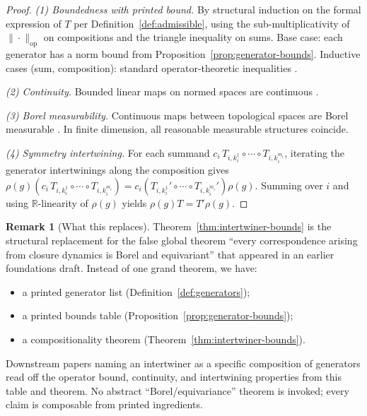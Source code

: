 \documentclass[11pt, a4paper]{amsart}
\theoremstyle{definition}
\newtheorem{remark}[theorem]{Remark}
\newcommand{\R}{\mathbb{R}}
\newcommand{\op}{\operatorname{op}}
\begin{document}
\begin{proof}
\emph{(1) Boundedness with printed bound.} By structural induction
on the formal expression of $T$ per
Definition~\ref{def:admissible}, using the sub-multiplicativity
of $\|\cdot\|_{\op}$ on compositions and the triangle inequality on
sums. Base case: each generator has a norm bound from
Proposition~\ref{prop:generator-bounds}. Inductive cases (sum,
composition): standard operator-theoretic inequalities
\cite[Ch.~I.1]{ReedSimonI}.

\emph{(2) Continuity.} Bounded linear maps on normed spaces are
continuous \cite[Thm.~I.1.3]{ReedSimonI}.

\emph{(3) Borel measurability.} Continuous maps between
topological spaces are Borel measurable
\cite[Cor.~1.2.12]{Bogachev}. In finite dimension, all reasonable
measurable structures coincide.

\emph{(4) Symmetry intertwining.} For each summand
$c_i \, T_{i, k_i^1} \circ \cdots \circ T_{i, k_i^{m_i}}$,
iterating the generator intertwinings along the composition
gives
$\rho(g) (c_i \, T_{i, k_i^1} \circ \cdots \circ T_{i, k_i^{m_i}})
= c_i (T_{i, k_i^1}' \circ \cdots \circ T_{i, k_i^{m_i}}')
\rho(g)$.
Summing over $i$ and using $\R$-linearity of $\rho(g)$ yields
$\rho(g) T = T' \rho(g)$.
\end{proof}

\begin{remark}[What this replaces]
\label{rmk:intertwiner-replacement}
Theorem~\ref{thm:intertwiner-bounds} is the structural replacement
for the false global theorem ``every correspondence arising from
closure dynamics is Borel and equivariant'' that appeared in an
earlier foundations draft. Instead of one grand theorem, we have:
\begin{itemize}
\item a printed generator list
  (Definition~\ref{def:generators});
\item a printed bounds table
  (Proposition~\ref{prop:generator-bounds});
\item a compositionality theorem
  (Theorem~\ref{thm:intertwiner-bounds}).
\end{itemize}
Downstream papers naming an intertwiner as a specific composition
of generators read off the operator bound, continuity, and
intertwining properties from this table and theorem. No abstract
``Borel/equivariance'' theorem is invoked; every claim is
composable from printed ingredients.
\end{remark}
\end{document}
